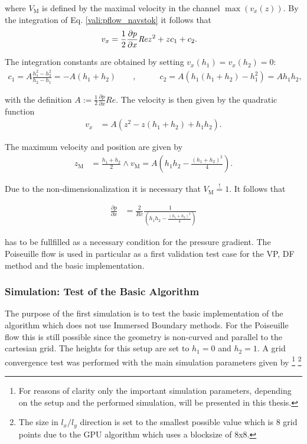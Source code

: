 where $V_\text{M}$ is defined by the maximal velocity in the channel $\max(v_x(z))$.
By the integration of Eq. \ref{vali:pflow_navstok} it follows that
\begin{align}
v_x &= \frac{1}{2}\frac{\partial p}{\partial x}\mbox{\textit{Re}} z^2 + zc_1 + c_2.
\end{align}

The integration constants are obtained by setting $v_x(h_1) = v_x(h_2) = 0$:
\begin{align}
c_1 = A\frac{h_1^2 -h_2^2}{h_2 - h_1} = -A(h_1+h_2)\qquad ,& \qquad
c_2 = A(h_1(h_1 + h_2) - h_1^2) = Ah_1h_2,
\end{align}

with the definition $A:=\frac{1}{2}\frac{\partial p}{\partial x} Re$.
The velocity is then given by the quadratic function
\begin{align}
\label{vali:pflow_theosol}
v_x &= A(z^2 - z(h_1 + h_2) + h_1h_2).
\end{align}

The maximum velocity and position are given by
\begin{align}
z_{\text{M}} &= \frac{h_1+h_2}{2} \wedge v_{\text{M}} = A\left(h_1h_2 - \frac{(h_1 + h_2)^2}{4}\right).
\end{align}

Due to the non-dimensionalization it is necessary that $V_{\text{M}} \overset{!}{=}  1$.
It follows that

\begin{align}
    \label{vali:pflow_pcondi}
\frac{\partial p}{\partial x} &= \frac{2}{Re}\frac{1}{\left(h_1h_2 - \frac{(h_1+h_2)^2}{4} \right)}
\end{align}

has to be fullfilled as a necessary condition for the pressure gradient.
The Poiseuille flow is used in particular as a first validation test case
for the VP, DF method  and the basic implementation.

\subsubsection{Simulation: Test of the Basic Algorithm}

The purpose of the first simulation is to test  the basic
implementation of the algorithm which does not use Immersed Boundary methods.
For the Poiseuille flow this is still possible since the geometry is non-curved
and parallel to the cartesian grid. The heights for this setup are set to $h_1=0$ and $h_2=1$.
A grid convergence test was performed with the main simulation parameters given by
\footnote{For reasons of clarity only the important simulation parameters, depending on the setup and the performed simulation,  will be presented in this thesis.}
\footnote{The size in $l_x/l_y$ direction is set to the smallest possible value which is 8 grid points due to the GPU algorithm which uses a blocksize of 8x8.}

